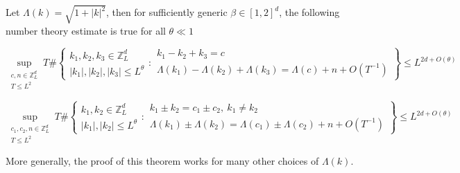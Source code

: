 \begin{thm}\label{th.numbertheory}
Let $\Lambda(k)=\sqrt{1+|k|^2}$, then for sufficiently generic $\beta\in [1,2]^d$, the following number theory estimate is true for all $\theta\ll 1$

\begin{equation}\label{eq.numbertheory}
    \sup_{\substack{c,n\in\mathbb{Z}_L^d\\T\le L^{2}}}
    T\#\left\{
        \begin{matrix}
            k_1,k_2,k_3\in\mathbb{Z}_L^d \\
            |k_1|,|k_2|,|k_3|\le L^\theta
        \end{matrix}
        :
        \begin{matrix}
            k_1-k_2+k_3=c \\
            \Lambda(k_1)-\Lambda(k_2)+\Lambda(k_3)=\Lambda(c)+n+O(T^{-1})
        \end{matrix}
    \right\}\le L^{2d+O(\theta)}
\end{equation}

\begin{equation}\label{eq.numbertheory'}
    \sup_{\substack{c_1,c_2,n\in\mathbb{Z}_L^d\\T\le L^{2}}}
    T\#\left\{
        \begin{matrix}
            k_1,k_2\in\mathbb{Z}_L^d \\
            |k_1|, |k_2|\le L^\theta
        \end{matrix}
        :
        \begin{matrix}
            k_1\pm k_2=c_1\pm c_{2},\ k_1\ne k_2 \\
            \Lambda(k_1)\pm\Lambda(k_2)=\Lambda(c_1)\pm \Lambda(c_2)+n+O(T^{-1})
        \end{matrix}
    \right\}\le L^{2d+O(\theta)}
\end{equation}

More generally, the proof of this theorem works for many other choices of $\Lambda(k)$.
\end{thm}



